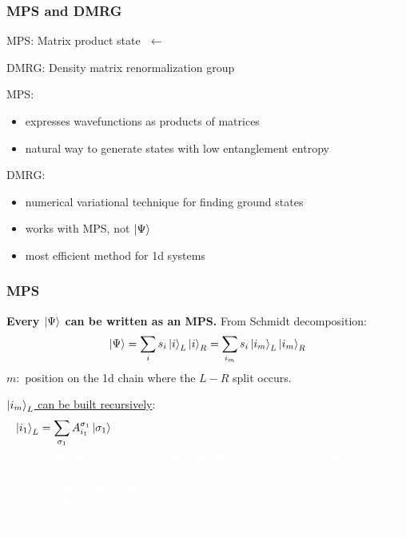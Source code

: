\documentclass{beamer}
\theoremstyle{definition}
\begin{document}
\begin{frame}
	\frametitle{MPS and DMRG}
	MPS: Matrix product state $\,\,\leftarrow$ \\
	
	\vspace{8pt}
	
	DMRG: Density matrix renormalization group\\
	
	\vspace{8pt}
	
	\pause
	
	
	\vspace{12pt}
	
	MPS: 
	\begin{itemize}
		\item expresses wavefunctions as products of matrices
		
		\item natural way to generate states with low entanglement entropy
	\end{itemize}
\pause

	DMRG:
	\begin{itemize}
		\item numerical variational technique for finding ground states
		
		\item works with MPS, not $\ket{\Psi}$
		
		\item most efficient method for 1d systems
	\end{itemize}
	
	
\end{frame}



\begin{frame}
	\frametitle{MPS}
	\textbf{Every $\ket{\Psi}$ can be written as an MPS.} From Schmidt decomposition:
	\begin{align*}
		\ket{\Psi} = \sum_{i} s_i \ket{i}_L \ket{i}_R = \sum_{i_m} s_i \ket{i_m}_L \ket{i_m}_R
	\end{align*}
	$m:$ position on the 1d chain where the $L-R$ split occurs. \\
	
	\vspace{15pt}
	\pause
	
	\underline{$\ket{i_m}_L$ can be built recursively}:
	\begin{align*}
		&\ket{i_1}_L = \sum_{\sigma_1}A^{\sigma_1}_{i_1}\ket{\sigma_1}\\ 
		&\textcolor{white}{\ket{i_2}_L = \sum_{i_1,\sigma_2} A^{\sigma_2}_{i_2,i_1}  \ket{i_1}_L \ket{\sigma_2} = \sum_{i_1,\sigma_1,\sigma_2} A^{\sigma_1}_{i_1}   A^{\sigma_2}_{i_2,i_1} \ket{\sigma_1\sigma_2} = \sum_{\sigma_1,\sigma_2} (A^{\sigma_1}A^{\sigma_2})_{1,i_2} \ket{\sigma_1\sigma_2}}\\
		&\textcolor{white}{\ket{i_3}_L = \sum_{\sigma_1,\sigma_2,\sigma_3}(A^{\sigma_1}A^{\sigma_2}A^{\sigma_3})_{1,i_3} \ket{\sigma_1\sigma_2\sigma_3}}\\
		&\textcolor{white}{\quad\vdots}
	\end{align*}
\end{frame}
\end{document}
